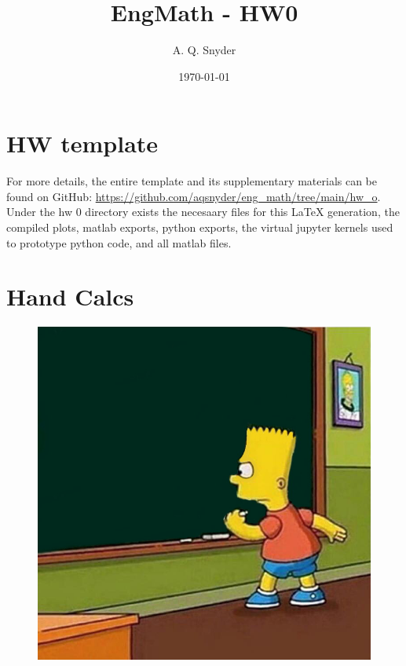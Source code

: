 \documentclass{article}
\begin{document}
\title{EngMath - HW0}
\author{A. Q. Snyder}
\date{\today}

\maketitle

\section{HW template}

\parbox{\textwidth}{
For more details, the entire template and its supplementary materials can be found on GitHub: \href{https://github.com/aqsnyder/eng_math/tree/main/ps_1}{https://github.com/aqsnyder/eng\_math/tree/main/hw\_o}.
Under the hw 0 directory exists the necesaary files for this LaTeX generation,  the compiled plots, matlab exports, python exports, the virtual jupyter kernels used to prototype python code, and all matlab files.
}

\section{Hand Calcs}
\begin{figure}[h]
    \centering
    \includegraphics[width=1\textwidth]{hand-calcs.jpg}
\end{figure}
\end{document}
